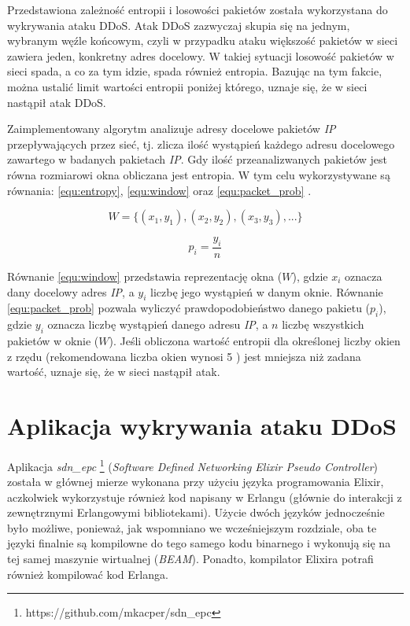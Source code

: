 Przedstawiona zależność entropii i losowości pakietów została wykorzystana do
wykrywania ataku DDoS. Atak DDoS zazwyczaj skupia się na jednym, wybranym węźle
końcowym, czyli w przypadku ataku większość pakietów w sieci zawiera jeden,
konkretny adres docelowy. W takiej sytuacji losowość pakietów w sieci spada, a
co za tym idzie, spada również entropia. Bazując na tym fakcie, można ustalić
limit wartości entropii poniżej którego, uznaje się, że w sieci nastąpił atak
DDoS. 

Zaimplementowany algorytm analizuje adresy docelowe pakietów \textit{IP}
przepływających przez sieć, tj. zlicza ilość wystąpień każdego adresu docelowego
zawartego w badanych pakietach \textit{IP}. Gdy ilość przeanalizwanych pakietów
jest równa rozmiarowi okna obliczana jest entropia. W tym celu wykorzystywane są
równania: \ref{equ:entropy}, \ref{equ:window} \cite{mainddosarticle} oraz
\ref{equ:packet_prob} \cite{mainddosarticle}.

\begin{equation}
W = \{(x_{1},y_{1}),(x_{2},y_{2}),(x_{3},y_{3}),...\}
\label{equ:window}
\end{equation}

\begin{equation}
p_{i} = \frac{y_{i}}{n}
\label{equ:packet_prob}
\end{equation}

Równanie \ref{equ:window} przedstawia reprezentację okna ($W$), gdzie $x_{i}$
oznacza dany docelowy adres \textit{IP}, a $y_{i}$ liczbę jego wystąpień w danym
oknie. Równanie \ref{equ:packet_prob} pozwala wyliczyć prawdopodobieństwo
danego pakietu ($p_{i}$), gdzie $y_{i}$ oznacza liczbę wystąpień danego adresu
\textit{IP}, a $n$ liczbę wszystkich pakietów w oknie ($W$).
Jeśli obliczona wartość entropii dla określonej liczby okien z rzędu
(rekomendowana liczba okien  wynosi 5 \cite{mainddosarticle}) jest mniejsza niż
zadana wartość, uznaje się, że w sieci nastąpił atak. 

\section{Aplikacja wykrywania ataku DDoS}

Aplikacja \textit{sdn\_epc} \footnote{https://github.com/mkacper/sdn\_epc}
(\textit{Software Defined Networking Elixir Pseudo Controller}) została w
głównej mierze wykonana przy użyciu języka programowania Elixir, aczkolwiek
wykorzystuje również kod napisany w Erlangu (głównie do interakcji z
zewnętrznymi Erlangowymi bibliotekami). Użycie dwóch języków jednocześnie było
możliwe, ponieważ, jak wspomniano we wcześniejszym rozdziale, oba te języki
finalnie są kompilowne do tego samego kodu binarnego i wykonują się na tej samej
maszynie wirtualnej (\textit{BEAM}). Ponadto, kompilator Elixira potrafi również 
kompilować kod Erlanga.

